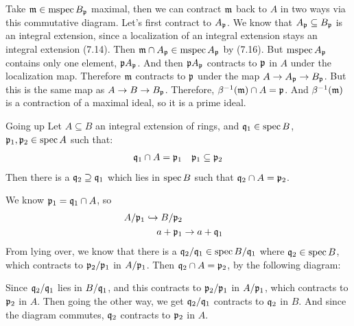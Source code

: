 \documentclass{article}
\begin{document}
Take $\mathfrak{m} \in \operatorname{mspec} B_{\mathfrak{p}}$ maximal, then we can contract $\mathfrak{m}$ back to $A$ in two ways via this commutative diagram. \gap Let's first contract to $A_{\mathfrak{p}}$. We know that $A_{\mathfrak{p}} \subseteq B_{\mathfrak{p}}$ is an integral extension, since a localization of an integral extension stays an integral extension (7.14). Then $\mathfrak{m} \cap A_{\mathfrak{p}} \in \operatorname{mspec} A_{\mathfrak{p}}$ by (7.16). But $\operatorname{mspec} A_{\mathfrak{p}}$ contains only one element, $\mathfrak{p} A_{\mathfrak{p}}$. And then $\mathfrak{p} A_{\mathfrak{p}}$ contracts to $\mathfrak{p}$ in $A$ under the localization map. Therefore $\mathfrak{m}$ contracts to $\mathfrak{p}$ under the map $A \to A_{\mathfrak{p}} \to B_{\mathfrak{p}}$. But this is the same map as $A \to B \to B_{\mathfrak{p}}$. Therefore, $\beta^{-1}(\mathfrak{m}) \cap A = \mathfrak{p}$. And $\beta^{-1}(\mathfrak{m})$ is a contraction of a maximal ideal, so it is a prime ideal. \endproof
\begin{fancyprop}{Going up}
    Let $A \subseteq B$ an integral extension of rings, and $\mathfrak{q}_{1} \in \operatorname{spec} B$, $\mathfrak{p}_{1}, \mathfrak{p}_{2} \in \operatorname{spec} A$ such that: \begin{align*}
        \mathfrak{q}_{1} \cap A = \mathfrak{p}_{1} & & \mathfrak{p}_{1} \subseteq \mathfrak{p}_{2}
    \end{align*}
    Then there is a $\mathfrak{q}_{2} \supseteq \mathfrak{q}_{1}$ which lies in $\operatorname{spec} B$ such that $\mathfrak{q}_{2} \cap A = \mathfrak{p}_{2}$.
\end{fancyprop}
\proof We know $\mathfrak{p}_{1} = \mathfrak{q}_{1} \cap A$, so \begin{align*}
    A/ \mathfrak{p}_{1} \hookrightarrow B / \mathfrak{p}_{2}\\
    a + \mathfrak{p}_{1} &\to a + \mathfrak{q}_{1}
\end{align*}
From lying over, we know that there is a $\mathfrak{q}_{2}/\mathfrak{q}_{1} \in \operatorname{spec} B/ \mathfrak{q}_{1}$ where $\mathfrak{q}_{2} \in \operatorname{spec} B$, which contracts to $\mathfrak{p}_{2}/\mathfrak{p}_{1}$ in $A / \mathfrak{p}_{1}$. \gap Then $\mathfrak{q}_{2} \cap A = \mathfrak{p}_{2}$, by the following diagram: \begin{center}
\end{center}
Since $\mathfrak{q}_{2}/\mathfrak{q}_{1}$ lies in $B/\mathfrak{q}_{1}$, and this contracts to $\mathfrak{p}_{2}/\mathfrak{p}_{1}$ in $A/\mathfrak{p}_{1}$, which contracts to $\mathfrak{p}_{2}$ in $A$. Then going the other way, we get $\mathfrak{q}_{2}/\mathfrak{q}_{1}$ contracts to $\mathfrak{q}_{2}$ in $B$. And since the diagram commutes, $\mathfrak{q}_{2}$ contracts to $\mathfrak{p}_{2}$ in $A$.
\end{document}
